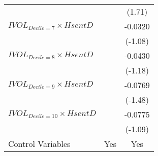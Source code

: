 \begin{tabular}{lcc}
        &         & (1.71) \\
$IVOL_{Decile = 7} \times HsentD$ &         & -0.0320 \\
        &         & (-1.08) \\
$IVOL_{Decile = 8} \times HsentD$ &         & -0.0430 \\
        &         & (-1.18) \\
$IVOL_{Decile = 9} \times HsentD$ &         & -0.0769 \\
        &         & (-1.48) \\
$IVOL_{Decile = 10} \times HsentD$ &         & -0.0775 \\
        &         & (-1.09) \\
\midrule
Control Variables & Yes     & Yes \\
\bottomrule
\end{tabular}%
